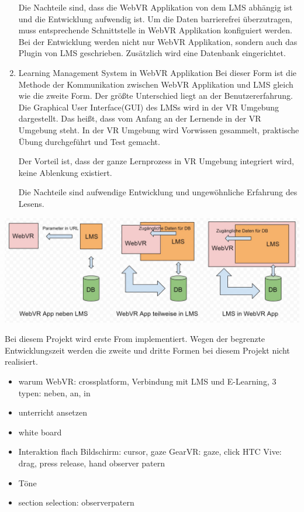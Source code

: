 \begin{enumerate}
     Die Nachteile sind, dass die WebVR Applikation von dem LMS abhängig ist und die Entwicklung aufwendig ist. Um die Daten barrierefrei überzutragen, muss entsprechende Schnittstelle in WebVR Applikation konfiguiert werden. Bei der Entwicklung werden nicht nur WebVR Applikation, sondern auch das Plugin von LMS geschrieben. Zusätzlich wird eine Datenbank eingerichtet.
     
    \item Learning Management System in WebVR Applikation
     \subitem Bei dieser Form ist die Methode der Kommunikation zwischen WebVR Applikation und LMS gleich wie die zweite Form. Der größte Unterschied liegt an der Benutzererfahrung. Die Graphical User Interface(GUI) des LMSs wird in der VR Umgebung dargestellt. Das heißt, dass vom Anfang an der Lernende in der VR Umgebung steht. In der VR Umgebung wird Vorwissen gesammelt, praktische Übung durchgeführt und Test gemacht.
     
     Der Vorteil ist, dass der ganze Lernprozess in VR Umgebung integriert wird, keine Ablenkung existiert.
     
     Die Nachteile sind aufwendige Entwicklung und ungewöhnliche Erfahrung des Lesens.
\end{enumerate}
\includegraphics[width=\textwidth]{images/formenDerVerbindung.jpg}

Bei diesem Projekt wird erste From implementiert. Wegen der begrenzte Entwicklungszeit werden die zweite und dritte Formen bei diesem Projekt nicht realisiert.




\begin{itemize}
\item warum WebVR: crossplatform, Verbindung mit LMS und E-Learning, 3 typen: neben, an, in
\item unterricht ansetzen
\item white board
\item Interaktion
\subitem flach Bildschirm: cursor, gaze
\subitem GearVR: gaze, click
\subitem HTC Vive: drag, press release, hand
\subitem observer patern
\item Töne
\item section selection: observerpatern
\end{itemize}